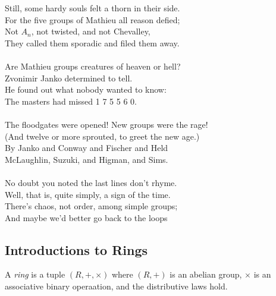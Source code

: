 \begin{raggedright}
Still, some hardy souls felt a thorn in their side. \\
For the five groups of Mathieu all reason defied; \\
Not $A_n$, not twisted, and not Chevalley, \\
They called them sporadic and filed them away. \\ \hspace{1em} \\

Are Mathieu groups creatures of heaven or hell? \\
Zvonimir Janko determined to tell. \\
He found out what nobody wanted to know: \\
The masters had missed 1 7 5 5 6 0. \\ \hspace{1em} \\

The floodgates were opened! New groups were the rage! \\
(And twelve or more sprouted, to greet the new age.) \\
By Janko and Conway and Fischer and Held \\
McLaughlin, Suzuki, and Higman, and Sims. \\ \hspace{1em} \\

No doubt you noted the last lines don't rhyme. \\
Well, that is, quite simply, a sign of the time. \\
There's chaos, not order, among simple groups; \\
And maybe we'd better go back to the loops
\end{raggedright}

\subsection{Introductions to Rings}

\begin{definition}[Ring]
A \emph{ring} is a tuple $(R,+,\times)$ where $(R,+)$ is an abelian group, $\times$ is an associative binary operaation, and the distributive laws hold.
\end{definition}